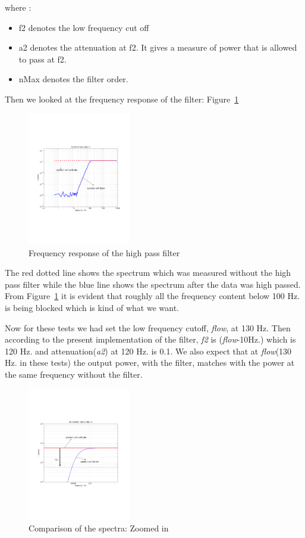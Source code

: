 where :
\begin{itemize}
  \item f2 denotes the low frequency cut off 
  \item a2 denotes the attenuation at f2. It gives a measure of power
    that is allowed to pass at f2.
  \item nMax denotes the filter order.
\end{itemize}

Then we looked at the frequency response of the filter: 
Figure~\ref{fig:butterworthtest4}
\begin{figure}[h]
\centering
\includegraphics[width=0.4\textwidth]{figures/butterworthtest4}
\caption{Frequency response of the high pass filter} \label{fig:butterworthtest4} 
\end{figure}

The red dotted line shows the spectrum which was measured without
the high pass filter while the blue line shows the spectrum after the data was 
high passed. From Figure~\ref{fig:butterworthtest4} 
it is evident that roughly all the frequency content below 100 Hz. is being
blocked which is kind of what we want. 

Now for these tests we had set the low frequency cutoff, \emph{flow}, at 130 Hz.
Then according to the present implementation of the filter, \emph{f2} is 
(\emph{flow}-10Hz.) which is 120 Hz. and attenuation(\emph{a2}) 
at 120 Hz. is 0.1. We also expect that at \emph{flow}(130 Hz. in these tests) 
the output power, with the filter, matches with the power at the same frequency 
without the filter.
\begin{figure}
\centering
\includegraphics[width=0.4\textwidth]{figures/testattenuation4}
\caption{Comparison of the spectra: Zoomed in} \label{fig:testattenuation4}
\end{figure} 

